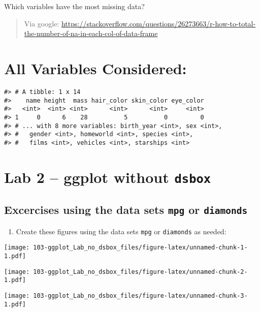 \documentclass[
]{book}
\providecommand{\tightlist}{%
  \setlength{\itemsep}{0pt}\setlength{\parskip}{0pt}}
\begin{document}
Which variables have the most missing data?

\begin{quote}
Via google: \url{https://stackoverflow.com/questions/26273663/r-how-to-total-the-number-of-na-in-each-col-of-data-frame}
\end{quote}

\hypertarget{all-variables-considered}{%
\chapter{All Variables Considered:}\label{all-variables-considered}}

\begin{verbatim}
#> # A tibble: 1 x 14
#>    name height  mass hair_color skin_color eye_color
#>   <int>  <int> <int>      <int>      <int>     <int>
#> 1     0      6    28          5          0         0
#> # ... with 8 more variables: birth_year <int>, sex <int>,
#> #   gender <int>, homeworld <int>, species <int>,
#> #   films <int>, vehicles <int>, starships <int>
\end{verbatim}

\hypertarget{lab-2-ggplot-without-dsbox}{%
\chapter{\texorpdfstring{Lab 2 -- ggplot without \texttt{dsbox}}{Lab 2 -- ggplot without dsbox}}\label{lab-2-ggplot-without-dsbox}}

\hypertarget{excercises-using-the-data-sets-mpg-or-diamonds}{%
\section{\texorpdfstring{Excercises using the data sets \texttt{mpg} or \texttt{diamonds}}{Excercises using the data sets mpg or diamonds}}\label{excercises-using-the-data-sets-mpg-or-diamonds}}

\begin{enumerate}
\def\labelenumi{\arabic{enumi}.}
\tightlist
\item
  Create these figures using the data sets \texttt{mpg} or \texttt{diamonds} as needed:
\end{enumerate}

\texttt{[image: 103-ggplot\_Lab\_no\_dsbox\_files/figure-latex/unnamed-chunk-1-1.pdf]}

\texttt{[image: 103-ggplot\_Lab\_no\_dsbox\_files/figure-latex/unnamed-chunk-2-1.pdf]}

\texttt{[image: 103-ggplot\_Lab\_no\_dsbox\_files/figure-latex/unnamed-chunk-3-1.pdf]}
\end{document}
